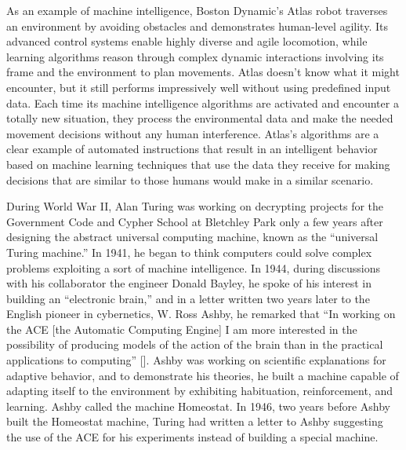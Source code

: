 As an example of machine intelligence, Boston Dynamic's Atlas robot traverses an environment by avoiding obstacles and demonstrates human-level agility. Its advanced control systems enable highly diverse and agile locomotion, while learning algorithms reason through complex dynamic interactions involving its frame and the environment to plan movements. Atlas doesn't know what it might encounter, but it still performs impressively well without using predefined input data. Each time its machine intelligence algorithms are activated and encounter a totally new situation, they process the environmental data and make the needed movement decisions without any human interference. Atlas's algorithms are a clear example of automated instructions that result in an intelligent behavior based on machine learning techniques that use the data they receive for making decisions that are similar to those humans would make in a similar scenario.

During World War II, Alan Turing was working on decrypting projects for the Government Code and Cypher School at Bletchley Park only a few years after designing the abstract universal computing machine, known as the ``universal Turing machine.'' In 1941, he began to think computers could solve complex problems exploiting a sort of machine intelligence. In 1944, during discussions with his collaborator the engineer Donald Bayley, he spoke of his interest in building an ``electronic brain,'' and in a letter written two years later to the English pioneer in cybernetics, W. Ross Ashby, he remarked that ``In working on the ACE [the Automatic Computing Engine] I am more interested in the possibility of producing models of the action of the brain than in the practical applications to computing'' [\citealt{chap:4:Turing:1946}]. Ashby was working on scientific explanations for adaptive behavior, and to demonstrate his theories, he built a machine capable of adapting itself to the environment by exhibiting habituation, reinforcement, and learning. Ashby called the machine Homeostat. In 1946, two years before Ashby built the \hbox{Homeostat} machine, Turing had written a letter to Ashby suggesting the use of the ACE for his experiments instead of building a special machine.

